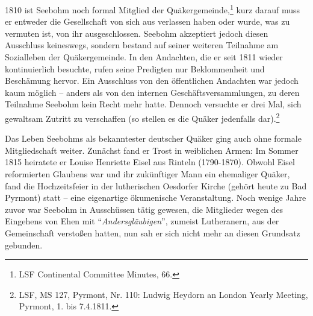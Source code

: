 \medskip

1810 ist Seebohm noch formal Mitglied der Quäkergemeinde,\footnote{LSF
Continental Committee Minutes, 66.} kurz darauf muss er entweder die
Gesellschaft von sich aus verlassen haben oder wurde, was zu vermuten ist, von
ihr ausgeschlossen. Seebohm akzeptiert jedoch diesen
Ausschluss keineswegs, sondern bestand auf seiner
weiteren Teilnahme am Sozialleben der Quäkergemeinde. In den Andachten, die er
seit 1811 wieder kontinuierlich besuchte, rufen seine Predigten nur
Beklommenheit und Beschämung hervor. Ein Ausschluss von den öffentlichen
Andachten war jedoch kaum möglich -- anders als von den internen
Geschäftsversammlungen, zu deren Teilnahme
Seebohm kein Recht mehr hatte. Dennoch versuchte er drei Mal, sich gewaltsam
Zutritt zu verschaffen (so stellen es die Quäker jedenfalls dar).\footnote{LSF,
MS 127, Pyrmont, Nr. 110: Ludwig Heydorn an London Yearly Meeting,
Pyrmont, 1. bis 7.4.1811.}

\medskip

Das Leben Seebohms als bekanntester deutscher Quäker ging auch ohne formale
Mitgliedschaft weiter. Zunächst fand er Trost in weiblichen Armen: Im Sommer
1815 heiratete er Louise Henriette Eisel aus Rinteln (1790-1870). Obwohl Eisel
reformierten Glaubens war und ihr zukünftiger Mann ein ehemaliger Quäker, fand
die Hochzeitsfeier in der lutherischen Oesdorfer Kirche (gehört heute zu Bad
Pyrmont) statt -- eine eigenartige ökumenische
Veranstaltung. Noch wenige Jahre zuvor war Seebohm in Ausschüssen tätig gewesen,
die Mitglieder wegen des Eingehens von Ehen mit
"`\textit{Andersgläubigen}"', zumeist
Lutheranern, aus der Gemeinschaft
verstoßen hatten, nun sah er sich nicht mehr an diesen
Grundsatz gebunden.

\medskip

